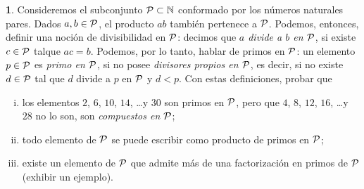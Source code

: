 \theoremstyle{definition}
\newtheorem{ejerPrimos}{\ejername}[section]


\begin{ejerPrimos}\label{ejer:factorizacion:pares}
	Consideremos el subconjunto $\cal P\subset\Naturales$ conformado por
	los n\'umeros naturales pares. Dados $a,b\in\cal P$, el producto
	$ab$ tambi\'en pertenece a $\cal P$. Podemos, entonces, definir una
	noci\'on de divisibilidad en $\cal P$: decimos que \emph{$a$ divide %
	a $b$ en $\cal P$}, si existe $c\in\cal P$ talque $ac=b$.
	Podemos, por lo tanto, hablar de primos en $\cal P$: un elemento
	$p\in\cal P$ es \emph{primo en $\cal P$}, si no posee
	\emph{divisores propios en $\cal P$}, es decir, si no existe
	$d\in\cal P$ tal que $d$ divide a $p$ en $\cal P$ y $d<p$.
	Con estas definiciones, probar que
	\begin{enumerate}[(i)]
		\item\label{item:ejer:factorizacion:pares:casos}
			los elementos $2$, $6$, $10$, $14$, \dots y $30$ son
			primos en $\cal P$, pero que
			$4$, $8$, $12$, $16$, \dots y $28$ no lo son, son
			\emph{compuestos en $\cal P$};
		\item\label{item:ejer:factorizacion:pares:existe}
			todo elemento de $\cal P$ se puede escribir como
			producto de primos en $\cal P$;
		\item\label{item:ejer:factorizacion:pares:no-es-unica}
			existe un elemento de $\cal P$ que admite m\'as de
			una factorizaci\'on en primos de $\cal P$ (exhibir
			un ejemplo).
	\end{enumerate}
\end{ejerPrimos}

